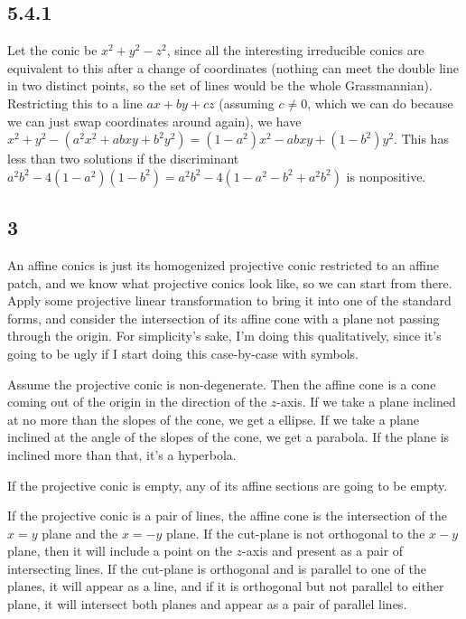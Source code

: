 \documentclass{article}
\begin{document}
\subsection*{5.4.1}
Let the conic be $x^2+y^2-z^2$, since all the interesting irreducible conics are equivalent to this after a change of coordinates (nothing can meet the double line in two distinct points, so the set of lines would be the whole Grassmannian). Restricting this to a line $ax+by+cz$ (assuming $c\neq0$, which we can do because we can just swap coordinates around again), we have $x^2+y^2-(a^2x^2+abxy+b^2y^2)=(1-a^2)x^2-abxy+(1-b^2)y^2$. This has less than two solutions if the discriminant $a^2b^2-4(1-a^2)(1-b^2)=a^2b^2-4(1-a^2-b^2+a^2b^2)$ is nonpositive. 
\subsection*{3}
An affine conics is just its homogenized projective conic restricted to an affine patch, and we know what projective conics look like, so we can start from there. Apply some projective linear transformation to bring it into one of the standard forms, and consider the intersection of its affine cone with a plane not passing through the origin. For simplicity's sake, I'm doing this qualitatively, since it's going to be ugly if I start doing this case-by-case with symbols.

Assume the projective conic is non-degenerate. Then the affine cone is a cone coming out of the origin in the direction of the $z$-axis. If we take a plane inclined at no more than the slopes of the cone, we get a ellipse. If we take a plane inclined at the angle of the slopes of the cone, we get a parabola. If the plane is inclined more than that, it's a hyperbola. 

If the projective conic is empty, any of its affine sections are going to be empty. 

If the projective conic is a pair of lines, the affine cone is the intersection of the $x=y$ plane and the $x=-y$ plane. If the cut-plane is not orthogonal to the $x-y$ plane, then it will include a point on the $z$-axis and present as a pair of intersecting lines. If the cut-plane is orthogonal and is parallel to one of the planes, it will appear as a line, and if it is orthogonal but not parallel to either plane, it will intersect both planes and appear as a pair of parallel lines.
\end{document}
